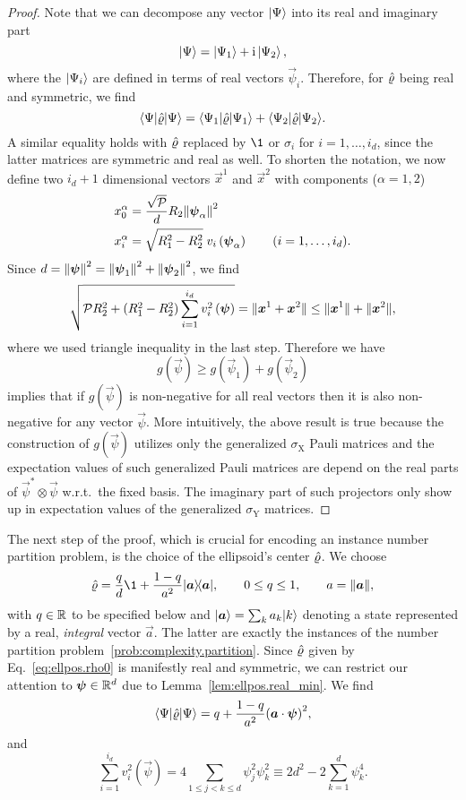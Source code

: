 \begin{proof}
  Note that we can decompose any vector $\ket\Psi$ into its real and imaginary part
  \[
    \ket\Psi = \ket{\Psi_1} + \ii\Ket{\Psi_2},
  \]
  where the $\ket{\Psi_i}$ are defined in terms of real vectors $\vec\psi_i$.
  Therefore, for $\hat{\varrho}$ being real and symmetric, we find
  \[
    \bra{\Psi} \estim\varrho \ket{\Psi} = \bra{\Psi_1} \estim\varrho \ket{\Psi_1} + \bra{\Psi_2} \estim\varrho \ket{\Psi_2}.
  \]
  A similar equality holds with $\hat{\varrho}$ replaced by $\1$ or $\sigma_i$ for $i=1,\ldots,i_d$, since the latter matrices are symmetric and real as well.
  To shorten the notation, we now define two $i_d+1$ dimensional vectors $\vec x^1$ and $\vec x^2$ with components ($\alpha=1,2$)
  \[
    \begin{split}
      x^\alpha_0 &= \frac{\sqrt{\mathcal{P}}}{d} R_2 {\Vert{\boldsymbol{\psi}}_\alpha\Vert}^2 \\
      x^\alpha_i &= \sqrt{R_1^2 - R_2^2}\;v_i\left({\boldsymbol{\psi}}_\alpha\right) \qquad (i=1,\ldots,i_d).
    \end{split}
  \]
  Since $d = {\Vert{\boldsymbol{\psi}}\Vert}^2 = {\Vert{\boldsymbol{\psi}}_1\Vert}^2 + {\Vert{\boldsymbol{\psi}}_2\Vert}^2$, we find
  \[
  \sqrt{ \mathcal{P} R_2^2 + (R_1^2 - R_2^2) \sum_{i=1}^{i_d} v_{i}^{2}\left({\boldsymbol{\psi}}\right)} = {\Vert{\boldsymbol{x}}^1 + {\boldsymbol{x}}^2\Vert} \le {\Vert{\boldsymbol{x}}^1\Vert} + {\Vert{\boldsymbol{x}}^2\Vert},
  \]
  where we used triangle inequality in the last step.
  Therefore we have
  \[
    \label{eq:ellpos.g_decomp}
    g(\vec\psi) \geq  g(\vec\psi_1) + g(\vec\psi_2)
  \]
   implies that if $g(\vec\psi)$ is non-negative for all real vectors then it is also non-negative for any vector $\vec\psi$.
  More intuitively, the above result is true because the construction of $g(\vec\psi)$ utilizes only the generalized $\sigma_\mathrm{X}$ Pauli matrices and the expectation values of such generalized Pauli matrices are depend on the real parts of $\vec\psi^*\otimes\vec\psi$ w.r.t.\ the fixed basis.
  The imaginary part of such projectors only show up in expectation values of the generalized $\sigma_\mathrm{Y}$ matrices.
\end{proof}

The next step of the proof, which is crucial for encoding an instance number partition problem, is the choice of the ellipsoid's center $\hat{\varrho}$.
We choose
\[
  \estim{\varrho}=\frac{q}{d}\1+\frac{1-q}{a^{2}} \ket{\vec a} \bra{\vec a},\qquad0\leq q\leq1,\qquad a=\norm{\vec a},
  \label{eq:ellpos.rho0}
\]
with $q \in {\mathbb{R}}$ to be specified below and $\ket{\vec a} =\sum_{k}a_{k}\ket{k} $ denoting a state represented by a real, \emph{integral} vector $\vec{a}$.
The latter are exactly the instances of the number partition problem~\ref{prob:complexity.partition}.
Since $\hat{\varrho}$ given by Eq.~\eqref{eq:ellpos.rho0} is manifestly real and symmetric, we can restrict our attention to ${\boldsymbol{\psi}} \in {\mathbb{R}}^d$ due to Lemma~\ref{lem:ellpos.real_min}. We find
\[
  \bra{\Psi}\estim{\varrho} \ket{\Psi} =q+\frac{1-q}{a^{2}}{\left(\vec{a}\cdot\vec{\psi}\right)}^{2},
\]
and
\[
  \sum_{i=1}^{i_{d}}v_{i}^{2}\left(\vec\psi\right)=4\sum_{1\leq j<k\leq d}\psi_{j}^{2}\psi_{k}^{2}\equiv2d^{2}-2\sum_{k=1}^{d}\psi_{k}^{4}.
\]

